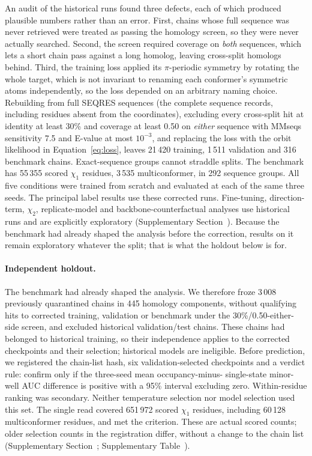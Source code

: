 \documentclass[10pt,twocolumn,a4paper]{article}
\begin{document}
 An audit of the
historical runs found three defects, each of which produced plausible numbers rather
than an error. First, chains whose full sequence was never retrieved were treated as
passing the homology screen, so they were never actually searched. Second, the screen
required coverage on \emph{both} sequences, which lets a short chain pass against a long
homolog, leaving cross-split homologs behind. Third, the training loss applied its
$\pi$-periodic symmetry by rotating the whole target, which is not invariant to renaming
each conformer's symmetric atoms independently, so the loss depended on an arbitrary
naming choice. Rebuilding from full SEQRES sequences (the complete sequence records, including residues absent from the coordinates), excluding every cross-split hit at
identity at least 30\% and coverage at least 0.50 on \emph{either} sequence with MMseqs sensitivity 7.5 and E-value at most $10^{-3}$, and replacing the loss with the orbit likelihood in Equation~\ref{eq:loss},
leaves 21\,420 training, 1\,511 validation and 316 benchmark chains. Exact-sequence groups
cannot straddle splits. The benchmark has 55\,355 scored $\chi_1$ residues, 3\,535
multiconformer, in 292 sequence groups. All five conditions were trained from scratch and evaluated at each of the same three seeds. The
principal label results use these corrected runs. Fine-tuning, direction-term, $\chi_2$,
replicate-model and backbone-counterfactual analyses use historical runs and are
explicitly exploratory (Supplementary Section~). Because the benchmark
had already shaped the analysis before the correction, results on it remain exploratory
whatever the split; that is what the holdout below is for.

\paragraph{Independent holdout.} The benchmark had already shaped the analysis.
We therefore froze 3\,008 previously quarantined chains in 445 homology components,
without qualifying hits to corrected training, validation or benchmark under the
30\%/0.50-either-side screen, and excluded historical validation/test chains.
These chains had belonged to historical training, so their independence applies to
the corrected checkpoints and their selection; historical models are ineligible.
Before prediction, we registered the chain-list hash, six validation-selected
checkpoints and a verdict rule: confirm only if the three-seed mean occupancy-minus-
single-state minor-well AUC difference is positive with a 95\% interval excluding zero.
Within-residue ranking was secondary. Neither temperature selection nor model selection used this set. The single read covered 651\,972 scored $\chi_1$ residues, including 60\,128
multiconformer residues, and met the criterion. These are actual scored counts;
older selection counts in the registration differ, without a change to the chain
list (Supplementary Section~; Supplementary Table~).
\end{document}

